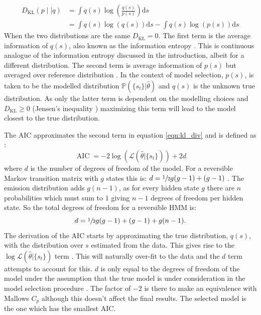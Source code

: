 \begin{equation}\label{eqn:kl_div}
\begin{split}
    D_{\mathrm{KL}}\left(p\mid | q\right) & = \int q(s) \log{\left(\frac{ q(s) }{p(s)}  \right)} \mathrm{d}s \\ 
    & = \int q(s) \log{\left(q(s)\right)}\mathrm{d}s - \int q(s)\log{\left(p(s)\right)} \mathrm{d}s
\end{split}
\end{equation}
When the two distributions are the same $D_{\mathrm{KL}} = 0$. The first term is the average information of $q(s)$, also known as the information entropy \cite{mackay2003information}. This is continuous analogue of the information entropy discussed in the introduction, albeit for a different distribution. The second term is average information of $p(s)$ but averaged over reference distribution \cite{mackay2003information}. In the context of model selection, $p(s)$, is taken to be the modelled distribution $\mathbb{P}(\{s_t\}|\hat{\theta})$ and $q(s)$ is the unknown true distribution. As only the latter term is dependent on the modelling choices and  $D_{\mathrm{KL}} \ge 0$ (Jensen's inequality \cite{mackay2003information}) maximizing this term will lead to the model closest to the true distribution.  

The AIC approximates the second term in equation \ref{eqn:kl_div} and is defined as \cite{akaikeInformationTheoryExtension1998}:
\begin{equation}\label{eqn:aic}
    \operatorname{AIC} = -2\log{\left(\mathcal{L}\left(\hat{\theta}|\{s_t\}\right)\right)} + 2d
\end{equation}
where $d$ is the number of degrees of freedom of the model. For a reversible Markov transition matrix with $g$ states this is: $d = \sfrac{1}{2}g(g-1) + (g-1)$ \cite{trendelkamp-schroerEstimationUncertaintyReversible2015b}. The emission distribution adds $g(n-1)$, as for every hidden state $g$ there are $n$ probabilities which must sum to $1$ giving $n-1$ degrees of freedom per hidden state. So the total degrees of freedom for a reversible HMM is:
\begin{equation}\label{eqn:hmm_dof}
    d = \sfrac{1}{2}g(g-1) + (g-1) + g(n-1). 
\end{equation}
The derivation of the AIC starts by approximating the true distribution, $q(s)$, with the distribution over $s$ estimated from the data. This gives rise to the $\log{\mathcal{L}\left(\hat{\theta}|\{s_t\} \right)}$ term \cite{mclachlanFiniteMixtureModels2000}.  This will naturally over-fit to the data and the $d$ term attempts to account for this. $d$ is only equal to the degrees of freedom of the model under the assumption that the true model is under consideration in the model selection procedure \cite{ripley_1996}.  The factor of $-2$ is there to make an equivalence with Mallows $C_p$ \cite{friedman2001elements} although this doesn't affect the final results. The selected model is the one which has the smallest AIC. 

